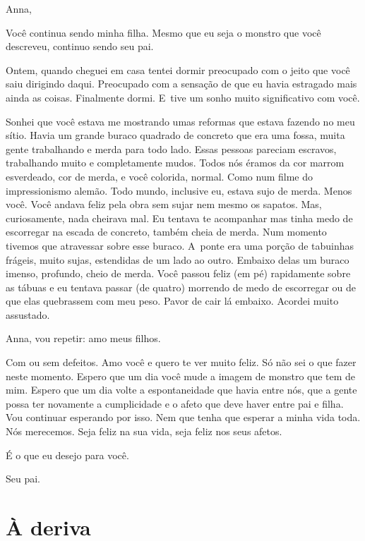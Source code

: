 \asterisc{}

Anna,

\medskip{} 

Você continua sendo minha filha. Mesmo que eu seja o monstro que você
descreveu, continuo sendo seu pai.

Ontem, quando cheguei em casa tentei dormir preocupado com o jeito que
você saiu dirigindo daqui. Preocupado com a sensação de que eu havia
estragado mais ainda as coisas. Finalmente dormi. E~tive um sonho muito
significativo com você.

Sonhei que você estava me mostrando umas reformas que estava fazendo no
meu sítio. Havia um grande buraco quadrado de concreto que era uma
fossa, muita gente trabalhando e merda para todo lado. Essas pessoas
pareciam escravos, trabalhando muito e completamente mudos. Todos nós
éramos da cor marrom esverdeado, cor de merda, e você colorida, normal.
Como num filme do impressionismo alemão. Todo mundo, inclusive eu,
estava sujo de merda. Menos você. Você andava feliz pela obra sem sujar
nem mesmo os sapatos. Mas, curiosamente, nada cheirava mal. Eu tentava
te acompanhar mas tinha medo de escorregar na escada de concreto, também
cheia de merda. Num momento tivemos que atravessar sobre esse buraco. A~ponte era uma porção de tabuinhas frágeis, muito sujas, estendidas de um
lado ao outro. Embaixo delas um buraco imenso, profundo, cheio de merda.
Você passou feliz (em pé) rapidamente sobre as tábuas e eu tentava
passar (de quatro) morrendo de medo de escorregar ou de que elas
quebrassem com meu peso. Pavor de cair lá embaixo. Acordei muito
assustado.

Anna, vou repetir: amo meus filhos.

Com ou sem defeitos. Amo você e quero te ver muito feliz. Só não sei o
que fazer neste momento. Espero que um dia você mude a imagem de monstro
que tem de mim. Espero que um dia volte a espontaneidade que havia entre
nós, que a gente possa ter novamente a cumplicidade e o afeto que deve
haver entre pai e filha. Vou continuar esperando por isso. Nem que tenha
que esperar a minha vida toda. Nós merecemos. Seja feliz na sua vida,
seja feliz nos seus afetos.

É o que eu desejo para você.
\medskip{}  \begin{flushright}Seu pai.\end{flushright}


\chapter{À deriva}


